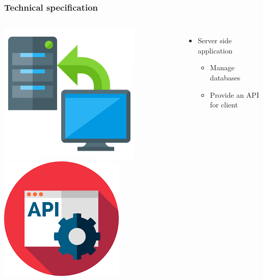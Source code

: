 \documentclass{beamer}
\begin{document}
\begin{frame}
    \frametitle{Technical specification}
    \begin{columns}
        \includegraphics[width=.8\textwidth]{images/server_to_client.png}
        \includegraphics[width=.7\textwidth]{images/api_icon.png}
        \begin{itemize}
            \pause
            \item Server side application 
            \begin{itemize}
                \item Manage databases
                \item Provide an API for client
            \end{itemize}
    

\end{itemize}
\end{columns}
\end{frame}
\end{document}
